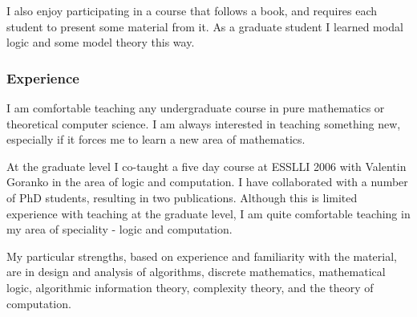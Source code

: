 \documentclass[12pt]{article}
\theoremstyle{plain} \numberwithin{equation}{section}
\theoremstyle{definition}
\begin{document}
I also enjoy participating in a course that follows a book, and requires each student to present some material from it. As a graduate student I learned modal logic and some model theory this way.

\subsubsection*{Experience}
I am comfortable teaching any undergraduate course in pure mathematics or theoretical computer science. 
I am always interested in teaching something new, especially if it forces me to learn a new area of mathematics.

At the graduate level I co-taught a five day course at ESSLLI 2006 with Valentin Goranko in the area of logic and computation. I have collaborated with a number of PhD students, resulting in two publications. Although this is limited experience with teaching at the graduate level, I am quite comfortable teaching in my area of speciality - logic and computation.

My particular strengths, based on experience and familiarity with the material, are in design and analysis of algorithms,
discrete mathematics, mathematical logic, algorithmic information theory, complexity theory, and the theory of computation. 
\end{document}
